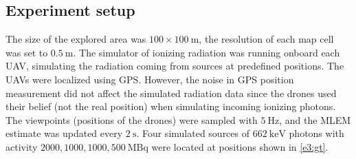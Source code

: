 \subsection{Experiment setup}
The size of the explored area was $100 \times 100\ \si{\meter}$, the resolution of each map cell was set to $\SI{0.5}{\meter}$.
The simulator of ionizing radiation was running onboard each \ac{UAV}, simulating the radiation coming from sources at predefined positions.
The \ac{UAV}s were localized using \ac{GPS}.
However, the noise in \ac{GPS} position measurement did not affect the simulated radiation data since the drones used their belief (not the real position) when simulating incoming ionizing photons.
The viewpoints (positions of the drones) were sampled with $\SI{5}{\hertz}$, and the \ac{MLEM} estimate was updated every $\SI{2}{\second}$.
Four simulated sources of $\SI{662}{\kilo\electronvolt}$ photons with activity $2000, 1000, 1000, 500\ \si{\mega\becquerel}$ were located at positions shown in  \autoref{e3:gt}.


